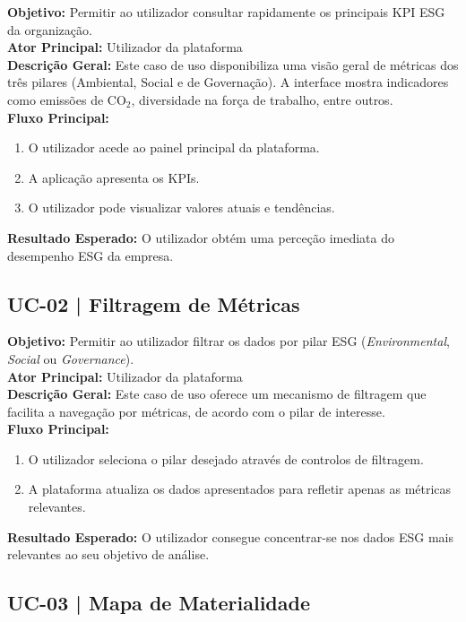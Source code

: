 \textbf{Objetivo:} Permitir ao utilizador consultar rapidamente os principais \gls{KPI} ESG da organização. \\
\textbf{Ator Principal:} Utilizador da plataforma \\
\textbf{Descrição Geral:} Este caso de uso disponibiliza uma visão geral de métricas dos três pilares (Ambiental, Social e de Governação). A interface mostra indicadores como emissões de CO$_2$, diversidade na força de trabalho, entre outros. \\
\textbf{Fluxo Principal:}
\begin{enumerate}
    \item O utilizador acede ao painel principal da plataforma.
    \item A aplicação apresenta os KPIs.
    \item O utilizador pode visualizar valores atuais e tendências.
\end{enumerate}
\textbf{Resultado Esperado:} O utilizador obtém uma perceção imediata do desempenho ESG da empresa.

\subsection{UC-02 | Filtragem de Métricas}

\textbf{Objetivo:} Permitir ao utilizador filtrar os dados por pilar ESG (\textit{Environmental}, \textit{Social} ou \textit{Governance}).\\
\textbf{Ator Principal:} Utilizador da plataforma\\
\textbf{Descrição Geral:} Este caso de uso oferece um mecanismo de filtragem que facilita a navegação por métricas, de acordo com o pilar de interesse.\\
\textbf{Fluxo Principal:}
\begin{enumerate}
    \item O utilizador seleciona o pilar desejado através de controlos de filtragem.
    \item A plataforma atualiza os dados apresentados para refletir apenas as métricas relevantes.
\end{enumerate}
\textbf{Resultado Esperado:} O utilizador consegue concentrar-se nos dados ESG mais relevantes ao seu objetivo de análise.

\subsection{UC-03 | Mapa de Materialidade}

